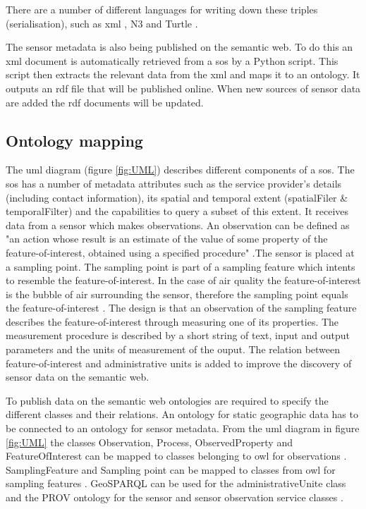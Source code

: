 There are a number of different languages for writing down these triples (serialisation), such as \ac{xml} \citep{LD:W3C3}, N3 \citep{LD:W3C5} and Turtle \citep{LD:W3C4}. 

The sensor metadata is also being published on the semantic web. To do this an \ac{xml} document is automatically retrieved from a \ac{sos} by a Python script. This script then extracts the relevant data from the \ac{xml} and maps it to an ontology. It outputs an \ac{rdf} file that will be published online. When new sources of sensor data are added the \ac{rdf} documents will be updated.   

\subsection{Ontology mapping}
The \ac{uml} diagram (figure \ref{fig:UML}) describes different components of a \ac{sos}. The \ac{sos} has a number of metadata attributes such as the service provider's details (including contact information), its spatial and temporal extent (spatialFiler \& temporalFilter) and the capabilities to query a subset of this extent. It receives data from a sensor which makes observations. An observation can be defined as "an action whose result is an estimate of the value of some property of the feature-of-interest, obtained using a specified procedure" \citep{SSW:Cox3}.The sensor is placed at a sampling point. The sampling point is part of a sampling feature which intents to resemble the feature-of-interest. In the case of air quality the feature-of-interest is the bubble of air surrounding the sensor, therefore the sampling point equals the feature-of-interest \citep{SDI:INSPIRE2}. The design is that an observation of the sampling feature describes the  feature-of-interest through measuring one of its properties. The measurement procedure is described by a short string of text, input and output parameters and the units of measurement of the ouput. The relation between feature-of-interest and administrative units is added to improve the discovery of sensor data on the semantic web. 

To publish data on the semantic web ontologies are required to specify the different classes and their relations. An ontology for static geographic data has to be connected to an ontology for sensor metadata. From the \ac{uml} diagram in figure \ref{fig:UML} the classes Observation, Process, ObservedProperty and FeatureOfInterest can be mapped to classes belonging to \ac{owl} for observations \citep{SSW:Cox}. SamplingFeature and Sampling point can be mapped to classes from \ac{owl} for sampling features \cite{SSW:Cox2}. GeoSPARQL can be used for the administrativeUnite class \citep{LD:OGC} and the PROV ontology for the sensor and sensor observation service classes \citep{LD:W3C2}. 

